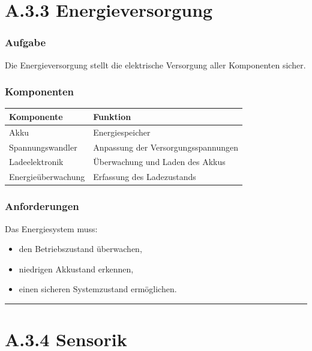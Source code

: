 \documentclass[
]{article}
\providecommand{\tightlist}{%
  \setlength{\itemsep}{0pt}\setlength{\parskip}{0pt}}
\begin{document}
\section{A.3.3 Energieversorgung}\label{a.3.3-energieversorgung}

\subsubsection{Aufgabe}\label{aufgabe-2}

Die Energieversorgung stellt die elektrische Versorgung aller
Komponenten sicher.

\subsubsection{Komponenten}\label{komponenten-1}

\begin{longtable}[]{@{}ll@{}}
\toprule\noalign{}
Komponente & Funktion \\
\midrule\noalign{}
\endhead
\bottomrule\noalign{}
\endlastfoot
Akku & Energiespeicher \\
Spannungswandler & Anpassung der Versorgungsspannungen \\
Ladeelektronik & Überwachung und Laden des Akkus \\
Energieüberwachung & Erfassung des Ladezustands \\
\end{longtable}

\subsubsection{Anforderungen}\label{anforderungen-2}

Das Energiesystem muss:

\begin{itemize}
\tightlist
\item
  den Betriebszustand überwachen,
\item
  niedrigen Akkustand erkennen,
\item
  einen sicheren Systemzustand ermöglichen.
\end{itemize}

\begin{center}\rule{0.5\linewidth}{0.5pt}\end{center}

\section{A.3.4 Sensorik}\label{a.3.4-sensorik}
\end{document}
